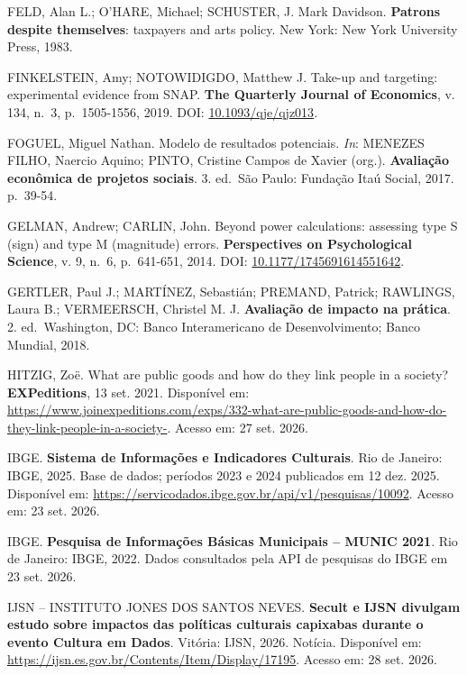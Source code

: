 \documentclass[12pt,a4paper]{article}
\newenvironment{referencias}{\raggedright\setlength{\parindent}{0pt}\setlength{\parskip}{0.5\baselineskip}}{\par}
\begin{document}
\begin{referencias}
\protect{}\label{ref-feld-16}{}FELD, Alan L.; O'HARE, Michael; SCHUSTER, J. Mark
Davidson. \textbf{Patrons despite themselves}: taxpayers and arts policy. New York: New York
University Press, 1983.

\protect{}\label{ref-finkelstein-17}{}FINKELSTEIN, Amy; NOTOWIDIGDO, Matthew J. Take-up
and targeting: experimental evidence from SNAP. \textbf{The Quarterly Journal of Economics}, v. 134,
n.~3, p.~1505-1556, 2019. DOI: \href{https://doi.org/10.1093/qje/qjz013}{10.1093/qje/qjz013}.

\protect{}\label{ref-foguel-18}{}FOGUEL, Miguel Nathan. Modelo de resultados
potenciais. \emph{In}: MENEZES FILHO, Naercio Aquino; PINTO, Cristine Campos de Xavier (org.).
\textbf{Avaliação econômica de projetos sociais}. 3. ed.~São Paulo: Fundação Itaú Social, 2017.
p.~39-54.

\protect{}\label{ref-gelman-19}{}GELMAN, Andrew; CARLIN, John. Beyond power
calculations: assessing type S (sign) and type M (magnitude) errors. \textbf{Perspectives on
Psychological Science}, v. 9, n.~6, p.~641-651, 2014. DOI:
\href{https://doi.org/10.1177/1745691614551642}{10.1177/1745691614551642}.

\protect{}\label{ref-gertler-20}{}GERTLER, Paul J.; MARTÍNEZ, Sebastián; PREMAND,
Patrick; RAWLINGS, Laura B.; VERMEERSCH, Christel M. J. \textbf{Avaliação de impacto na prática}. 2.
ed.~Washington, DC: Banco Interamericano de Desenvolvimento; Banco Mundial, 2018.

\protect{}\label{ref-hitzig-21}{}HITZIG, Zoë. What are public goods and how do they
link people in a society? \textbf{EXPeditions}, 13 set. 2021. Disponível em:
\url{https://www.joinexpeditions.com/exps/332-what-are-public-goods-and-how-do-they-link-people-in-a-society-}.
Acesso em: 27 set. 2026.

\protect{}\label{ref-ibge-22}{}IBGE. \textbf{Sistema de Informações e Indicadores
Culturais}. Rio de Janeiro: IBGE, 2025. Base de dados; períodos 2023 e 2024 publicados em 12 dez.
2025. Disponível em: \url{https://servicodados.ibge.gov.br/api/v1/pesquisas/10092}. Acesso em: 23
set. 2026.

\protect{}\label{ref-ibge-23}{}IBGE. \textbf{Pesquisa de Informações Básicas Municipais
-- MUNIC 2021}. Rio de Janeiro: IBGE, 2022. Dados consultados pela API de pesquisas do IBGE em 23
set. 2026.

\protect{}\label{ref-ijsn-24}{}IJSN -- INSTITUTO JONES DOS SANTOS NEVES. \textbf{Secult
e IJSN divulgam estudo sobre impactos das políticas culturais capixabas durante o evento Cultura em
Dados}. Vitória: IJSN, 2026. Notícia. Disponível em:
\url{https://ijsn.es.gov.br/Contents/Item/Display/17195}. Acesso em: 28 set. 2026.


\end{referencias}
\end{document}
